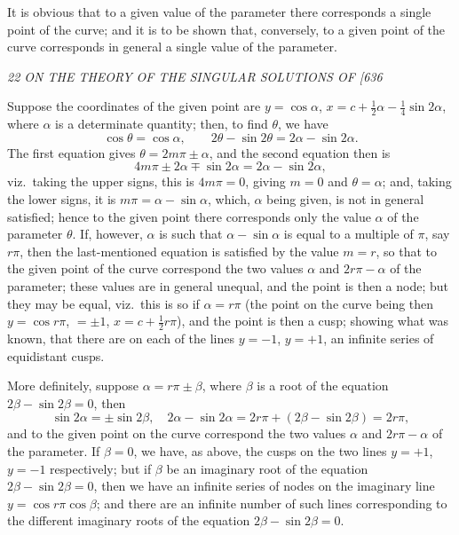 \documentclass[12pt,a4paper]{article}
\begin{document}
It is obvious that to a given value of the parameter there corresponds a single point of the curve; and it is to be shown that, conversely, to a given point of the curve corresponds in general a single value of the parameter.

\clearpage
\setcounter{page}{22}

\begin{center}
\textit{22 \hfill ON THE THEORY OF THE SINGULAR SOLUTIONS OF \hfill [636}
\end{center}

Suppose the coordinates of the given point are $y = \cos\alpha$, $x = c + \tfrac{1}{2}\alpha - \tfrac{1}{4}\sin 2\alpha$, where $\alpha$ is a determinate quantity; then, to find $\theta$, we have
\[
\cos\theta = \cos\alpha, \qquad 2\theta - \sin 2\theta = 2\alpha - \sin 2\alpha.
\]
The first equation gives $\theta = 2 m \pi \pm \alpha$, and the second equation then is
\[
4 m \pi \pm 2\alpha \mp \sin 2\alpha = 2\alpha - \sin 2\alpha,
\]
viz.\ taking the upper signs, this is $4 m \pi = 0$, giving $m = 0$ and $\theta = \alpha$; and, taking the lower signs, it is $m \pi = \alpha - \sin\alpha$, which, $\alpha$ being given, is not in general satisfied; hence to the given point there corresponds only the value $\alpha$ of the parameter $\theta$. If, however, $\alpha$ is such that $\alpha - \sin\alpha$ is equal to a multiple of $\pi$, say $r\pi$, then the last-mentioned equation is satisfied by the value $m = r$, so that to the given point of the curve correspond the two values $\alpha$ and $2 r \pi - \alpha$ of the parameter; these values are in general unequal, and the point is then a node; but they may be equal, viz.\ this is so if $\alpha = r\pi$ (the point on the curve being then $y = \cos r\pi$, $= \pm 1$, $x = c + \tfrac{1}{2} r \pi$), and the point is then a cusp; showing what was known, that there are on each of the lines $y = -1$, $y = +1$, an infinite series of equidistant cusps.

More definitely, suppose $\alpha = r\pi \pm \beta$, where $\beta$ is a root of the equation $2\beta - \sin 2\beta = 0$, then
\[
\sin 2\alpha = \pm \sin 2\beta, \quad 2\alpha - \sin 2\alpha = 2 r \pi + (2\beta - \sin 2\beta) = 2 r \pi,
\]
and to the given point on the curve correspond the two values $\alpha$ and $2 r \pi - \alpha$ of the parameter. If $\beta = 0$, we have, as above, the cusps on the two lines $y = +1$, $y = -1$ respectively; but if $\beta$ be an imaginary root of the equation $2\beta - \sin 2\beta = 0$, then we have an infinite series of nodes on the imaginary line $y = \cos r\pi \cos\beta$; and there are an infinite number of such lines corresponding to the different imaginary roots of the equation $2\beta - \sin 2\beta = 0$.
\end{document}
